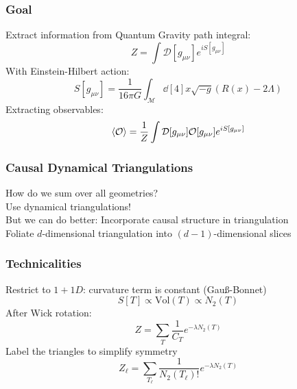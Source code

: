 
\begin{frame}
    \frametitle{Goal}
    Extract information from Quantum Gravity path integral:
    \begin{equation}
        Z = \int \mathcal{D}[g_{\mu \nu}] e^{i S[g_{\mu \nu}]}
    \end{equation}
    With Einstein-Hilbert action:
    \begin{equation}
        S[g_{\mu \nu}]
        =
        \frac{1}{16 \pi G}
        \int_\mathcal{M} \dd[4]{x} \sqrt{-g}
        (R(x) - 2 \Lambda)
    \end{equation}
    Extracting observables:
    \begin{equation}
        \ev{\mathcal{O}}
        =
        \frac{1}{Z} \int \mathcal{D}[g_{\mu \nu}]
        \mathcal{O}[g_{\mu \nu}]
        e^{i S[g_{\mu \nu}]}
    \end{equation}
\end{frame}

\begin{frame}
    \frametitle{Causal Dynamical Triangulations}
    How do we sum over all geometries? \\
    Use dynamical triangulations! \\
    But we can do better: Incorporate causal structure in triangulation \\
    Foliate $d$-dimensional triangulation into $(d - 1)$-dimensional slices \\
\end{frame}

\begin{frame}
    \frametitle{Technicalities}
    Restrict to $1 + 1D$: curvature term is constant (Gau\ss -Bonnet) \\
    \begin{equation}
        S[T] \propto \text{Vol}(T) \propto N_2(T)
    \end{equation}
    After Wick rotation:
    \begin{equation}
        Z = \sum_{T} \frac{1}{C_T} e^{-\lambda N_2(T)}
    \end{equation}
    Label the triangles to simplify symmetry
    \begin{equation}
        Z_\ell = \sum _{T_\ell} \frac{1}{N_2(T_\ell)!} e^{-\lambda N_2(T)}
    \end{equation}
\end{frame}